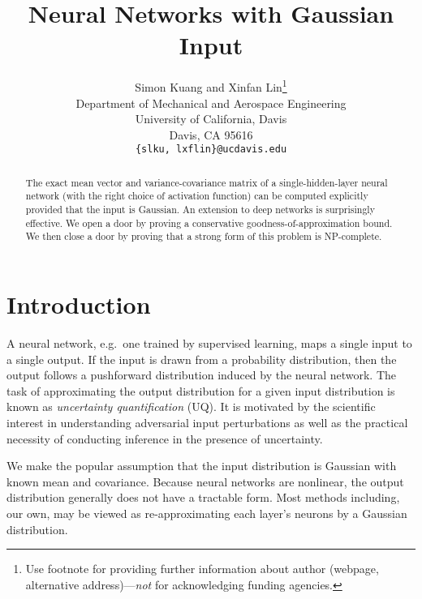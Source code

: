 \documentclass{article}
\title{Neural Networks with Gaussian Input}
\author{%
  Simon Kuang and Xinfan Lin\thanks{\color{red} Use footnote for providing further information
    about author (webpage, alternative address)---\emph{not} for acknowledging
    funding agencies.} \\
  Department of Mechanical and Aerospace Engineering\\
  University of California, Davis\\
  Davis, CA 95616 \\
  \texttt{\{slku, lxflin\}@ucdavis.edu} \\
}
\begin{document}
\maketitle


\begin{abstract}
    The exact mean vector and variance-covariance matrix of a single-hidden-layer neural network (with the right choice of activation function) can be computed explicitly provided that the input is Gaussian.
    An extension to deep networks is surprisingly effective.
    We open a door by proving a conservative goodness-of-approximation bound.
    We then close a door by proving that a strong form of this problem is NP-complete.
\end{abstract}

\section{Introduction}
A neural network, e.g.~one trained by supervised learning, maps a single input to a single output.
If the input is drawn from a probability distribution, then the output follows a pushforward distribution induced by the neural network.
The task of approximating the output distribution for a given input distribution is known as \emph{uncertainty quantification} (UQ).
It is motivated by the scientific interest in understanding adversarial input perturbations as well as the practical necessity of conducting inference in the presence of uncertainty.

We make the popular assumption that the input distribution is Gaussian with known mean and covariance.
Because neural networks are nonlinear, the output distribution generally does not have a tractable form.
Most methods including, our own, may be viewed as re-approximating each layer's neurons by a Gaussian distribution.
\end{document}
